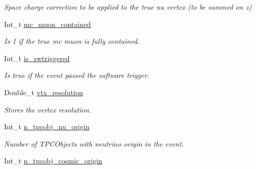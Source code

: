 \begin{DoxyCompactItemize}
\begin{DoxyCompactList}\small\item\em Space charge correction to be applied to the true nu vertex (to be summed on z) \end{DoxyCompactList}\item 
\hypertarget{classUBXSecEvent_a350303f94db8bcfdbc2e517713d7ebf9}{Int\-\_\-t \hyperlink{classUBXSecEvent_a350303f94db8bcfdbc2e517713d7ebf9}{mc\-\_\-muon\-\_\-contained}}\label{classUBXSecEvent_a350303f94db8bcfdbc2e517713d7ebf9}

\begin{DoxyCompactList}\small\item\em Is 1 if the true mc muon is fully contained. \end{DoxyCompactList}\item 
\hypertarget{classUBXSecEvent_aedee1ade9f68dfb32fba0b943125f52d}{Int\-\_\-t \hyperlink{classUBXSecEvent_aedee1ade9f68dfb32fba0b943125f52d}{is\-\_\-swtriggered}}\label{classUBXSecEvent_aedee1ade9f68dfb32fba0b943125f52d}

\begin{DoxyCompactList}\small\item\em Is true if the event passed the software trigger. \end{DoxyCompactList}\item 
\hypertarget{classUBXSecEvent_aa6c3a4dd22dfd2d39be8fa74b3703230}{Double\-\_\-t \hyperlink{classUBXSecEvent_aa6c3a4dd22dfd2d39be8fa74b3703230}{vtx\-\_\-resolution}}\label{classUBXSecEvent_aa6c3a4dd22dfd2d39be8fa74b3703230}

\begin{DoxyCompactList}\small\item\em Stores the vertex resolution. \end{DoxyCompactList}\item 
\hypertarget{classUBXSecEvent_a0ae9b16a767089e072f0b82da7e071d4}{Int\-\_\-t \hyperlink{classUBXSecEvent_a0ae9b16a767089e072f0b82da7e071d4}{n\-\_\-tpcobj\-\_\-nu\-\_\-origin}}\label{classUBXSecEvent_a0ae9b16a767089e072f0b82da7e071d4}

\begin{DoxyCompactList}\small\item\em Number of T\-P\-C\-Objects with neutrino origin in the event. \end{DoxyCompactList}\item 
\hypertarget{classUBXSecEvent_a64e81de34497d79043b873862c28fd87}{Int\-\_\-t \hyperlink{classUBXSecEvent_a64e81de34497d79043b873862c28fd87}{n\-\_\-tpcobj\-\_\-cosmic\-\_\-origin}}\label{classUBXSecEvent_a64e81de34497d79043b873862c28fd87}


\end{DoxyCompactItemize}
